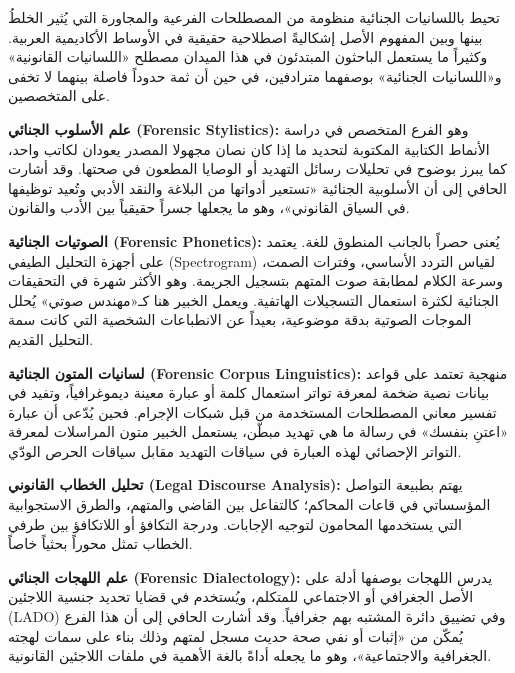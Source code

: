 تحيط باللسانيات الجنائية منظومة من المصطلحات الفرعية والمجاورة التي يُثير الخلطُ بينها وبين المفهوم الأصل إشكاليةً اصطلاحية حقيقية في الأوساط الأكاديمية العربية. وكثيراً ما يستعمل الباحثون المبتدئون في هذا الميدان مصطلح «اللسانيات القانونية» و«اللسانيات الجنائية» بوصفهما مترادفين، في حين أن ثمة حدوداً فاصلة بينهما لا تخفى على المتخصصين.\autocite[12]{doha2023}

\textbf{علم الأسلوب الجنائي (\textenglish{Forensic Stylistics}):} وهو الفرع المتخصص في دراسة الأنماط الكتابية المكتوبة لتحديد ما إذا كان نصان مجهولا المصدر يعودان لكاتب واحد، كما يبرز بوضوح في تحليلات رسائل التهديد أو الوصايا المطعون في صحتها. وقد أشارت الحافي إلى أن الأسلوبية الجنائية «تستعير أدواتها من البلاغة والنقد الأدبي وتُعيد توظيفها في السياق القانوني»، وهو ما يجعلها جسراً حقيقياً بين الأدب والقانون\autocite[7]{alhafi2023}.

\textbf{الصوتيات الجنائية (\textenglish{Forensic Phonetics}):} يُعنى حصراً بالجانب المنطوق للغة. يعتمد على أجهزة التحليل الطيفي (\textenglish{Spectrogram}) لقياس التردد الأساسي، وفترات الصمت، وسرعة الكلام لمطابقة صوت المتهم بتسجيل الجريمة. وهو الأكثر شهرة في التحقيقات الجنائية لكثرة استعمال التسجيلات الهاتفية\autocite[10]{alhafi2023}. ويعمل الخبير هنا كـ«مهندس صوتي» يُحلل الموجات الصوتية بدقة موضوعية، بعيداً عن الانطباعات الشخصية التي كانت سمة التحليل القديم.

\textbf{لسانيات المتون الجنائية (\textenglish{Forensic Corpus Linguistics}):} منهجية تعتمد على قواعد بيانات نصية ضخمة لمعرفة تواتر استعمال كلمة أو عبارة معينة ديموغرافياً، وتفيد في تفسير معاني المصطلحات المستخدمة من قبل شبكات الإجرام\autocite[119]{alassimi2018}. فحين يُدّعى أن عبارة «اعتنِ بنفسك» في رسالة ما هي تهديد مبطّن، يستعمل الخبير متون المراسلات لمعرفة التواتر الإحصائي لهذه العبارة في سياقات التهديد مقابل سياقات الحرص الودّي.

\textbf{تحليل الخطاب القانوني (\textenglish{Legal Discourse Analysis}):} يهتم بطبيعة التواصل المؤسساتي في قاعات المحاكم؛ كالتفاعل بين القاضي والمتهم، والطرق الاستجوابية التي يستخدمها المحامون لتوجيه الإجابات. ودرجة التكافؤ أو اللاتكافؤ بين طرفي الخطاب تمثل محوراً بحثياً خاصاً.

\textbf{علم اللهجات الجنائي (\textenglish{Forensic Dialectology}):} يدرس اللهجات بوصفها أدلة على الأصل الجغرافي أو الاجتماعي للمتكلم، ويُستخدم في قضايا تحديد جنسية اللاجئين (\textenglish{LADO}) وفي تضييق دائرة المشتبه بهم جغرافياً. وقد أشارت الحافي إلى أن هذا الفرع يُمكّن من «إثبات أو نفي صحة حديث مسجل لمتهم وذلك بناء على سمات لهجته الجغرافية والاجتماعية»\autocite[9]{alhafi2023}، وهو ما يجعله أداةً بالغة الأهمية في ملفات اللاجئين القانونية.

